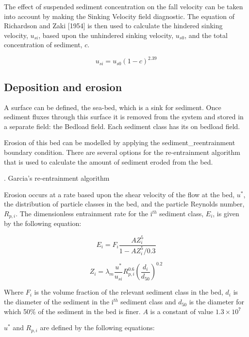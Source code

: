 The effect of suspended sediment concentration on the fall velocity can be taken into
account by making the Sinking Velocity field diagnostic. The equation of Richardson and
Zaki [1954] is then used to calculate the hindered sinking velocity, $u_{si}$, based upon
the unhindered sinking velocity, $u_{s0}$, and the total concentration of sediment, $c$.

\begin{equation}\label{eq:hindered_sinking_velocity}
  u_{si} = u_{s0}(1-c)^{2.39}
\end{equation}

\subsection{Deposition and erosion}

A surface can be defined, the sea-bed, which is a sink for sediment. Once sediment fluxes
through this surface it is removed from the system and stored in a separate field: the
Bedload field. Each sediment class has its on bedload field.

Erosion of this bed can be modelled by applying the sediment\_reentrainment boundary
condition. There are several options for the re-entrainment algorithm that is used to
calculate the amount of sediment eroded from the bed.

. Garcia's re-entrainment algorithm

Erosion occurs at a rate based upon the shear velocity of the flow at the bed, $u^*$, the
distribution of particle classes in the bed, and the particle Reynolds number,
$R_{p,i}$. The dimensionless entrainment rate for the i$^{th}$ sediment class, $E_i$, is
given by the following equation:

\begin{equation}
  E_i = F_i \frac{AZ_i^5}{1-AZ_i^5/0.3}
\end{equation}

\begin{equation}
  Z_i = \lambda_m \frac{u^*}{u_{si}} R_{p,i}^{0.6} \left (\frac{d_i}{d_{50}} \right)^{0.2}
\end{equation}

\noindent
Where $F_i$ is the volume fraction of the relevant sediment class in the bed, $d_i$ is the
diameter of the sediment in the i$^{th}$ sediment class and $d_{50}$ is the diameter for
which 50\% of the sediment in the bed is finer. $A$ is a constant of value $1.3 \times
10^7$

\noindent
$u^*$ and $R_{p,i}$ are defined by the following equations:

